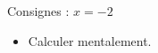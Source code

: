 \documentclass[17pt]{flash}
\begin{document}
\flashvisibletimertrue
\FlashSetItemSep{30pt}
\FlashSetVtop{-4em}

\begin{frame}{Consignes : $x=-2$}
    \begin{itemize}
        \item Calculer mentalement.
    \end{itemize}
\end{frame}

\end{document}
